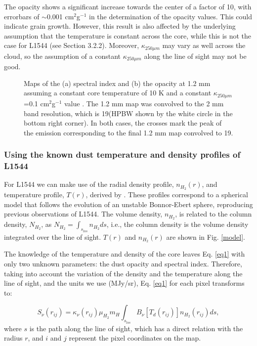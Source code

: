 \documentclass{aa}
\begin{document}
The opacity shows a significant increase towards the center of a factor of 10, with errorbars of $\sim$0.001 cm$^2$g$^{-1}$ in the determination of the opacity values. This could indicate grain growth. However, this result is also affected by the underlying assumption that the temperature is constant across the core, while this is not the case for L1544 (see Section 3.2.2). Moreover, $\kappa_{250 \mu m}$ may vary as well across the cloud, so the assumption of a constant $\kappa_{250 \mu m}$ along the line of sight may not be good. 

\begin{figure} 
\caption{Maps of the (a) spectral index and (b) the opacity at 1.2 mm assuming a constant core temperature of 10 K and a constant $\kappa _{250 \mu m}$=0.1 cm$^2$g$^{-1}$ value . The 1.2 mm map was convolved to the 2 mm band resolution, which is 19\arcsec (HPBW shown by the white circle in the bottom right corner). In both cases, the crosses mark the peak of the emission corresponding to the final 1.2 mm map convolved to 19\arcsec.}
\label{kappa-beta-10k}
\end{figure}


\subsubsection{Using the known dust temperature and density profiles of L1544}

For L1544 we can make use of the radial density profile, $n_{H_{2}}(r)$, and temperature profile, $T(r)$, derived by . These profiles correspond to a spherical model that follows the evolution of an unstable Bonnor-Ebert sphere, reproducing previous observations of L1544. The volume density, $n_{H_{2}}$, is related to the column density, $N_{H_2}$, as $N_{H_2} = \int_{s_{los}}^{}{n_{H_{2}} ds}$, i.e., the column density is the volume density integrated over the line of sight. $T(r)$ and $n_{H_{2}}(r)$ are shown in Fig. \ref{model}. 

The knowledge of the temperature and density of the core leaves Eq. \eqref{eq1} with only two unknown parameters: the dust opacity and spectral index. Therefore, taking into account the variation of the density and the temperature along the line of sight, and the units we use (MJy/sr), Eq. \eqref{eq1} for each pixel transforms to:

\begin{equation}
S_{\nu}(r_{ij}) = \kappa_{\nu}(r_{ij}) \mu_{H_2} m_{H}   \int_{s_{los}}^{}{B_{\nu}[T_{d}(r_{ij})]n_{H_{2}}(r_{ij}) ds},
\label{eqSS}
\end{equation} 
where $s$ is the path along the line of sight, which has a direct relation with the radius $r$, and $i$ and $j$ represent the pixel coordinates on the map.  
\end{document}
